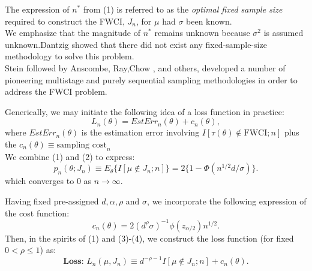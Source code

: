 \documentclass [xcolor=svgnames, t] {beamer}
\begin{document}
 \begin{frame}{}
  \vspace{7mm}

The expression of $n^*$ from (1) is referred to as the \textit{optimal fixed sample size} required to 
construct the FWCI, $J_n$, for $\mu$ had $\sigma$ been known. \\
\vspace{0.2cm}
We emphasize that the magnitude of $n^*$ remains unknown because $\sigma^2$ is 
assumed unknown.Dantzig\cite{dantzig1940} showed that there 
did not exist any fixed-sample-size methodology to solve this problem.\\
\vspace{0.2cm}
Stein\cite{stein1949} followed by Anscombe\cite{anscombe1953}, Ray\cite{ray1957},Chow \cite{chow1965}, and
others, developed a number of pioneering multistage and purely sequential sampling
methodologies in order to address the FWCI problem.

\end{frame}
\begin{frame}{}
    \vspace{7mm}
    Generically, we may initiate the following idea of a loss function in practice:
        \begin{equation} \label{loss_fn}
            L_n(\theta)  = EstErr_n(\theta)+c_n(\theta),
        \end{equation}
        where $EstErr_n(\theta)$ is the estimation error involving 
        $I \left[ {\tau(\theta) \not\in \text{FWCI};n} \right]$ plus the $c_n(\theta) \equiv \text{sampling cost}_n$\\
        \vspace{2mm}
    We combine (1) and (2) to express:
        \begin{equation}
        p_n(\theta ;J_n) \equiv E_{\theta} \{ {I[ \mu \not\in J_n;n]}\} =2\{ 1-\Phi(n^{1/2}d/\sigma) \}.
        \end{equation}
        which converges to $0$ as $n \rightarrow \infty$.\\
        \vspace{0.1cm}
                
\end{frame}
\begin{frame}{}
\vspace{10mm}
Having fixed pre-assigned $d,\alpha,\rho$ and $\sigma$, we incorporate the 
following expression of the cost function:
        \begin{equation} \label{cost_fn}
        c_n(\theta) = 2(d^\rho \sigma)^{-1} \phi(z_{\alpha/2})n^{1/2}.
        \end{equation}
Then, in the spirits of (1) and (3)-(4), we construct the loss function (for fixed $0<\rho \le 1$) as:
        \begin{equation}
            \textbf{Loss: }L_n(\mu,J_n) \equiv d^{-\rho-1}I[\mu \not\in J_n;n]+c_n(\theta).
        \end{equation}

\end{frame}
\end{document}
